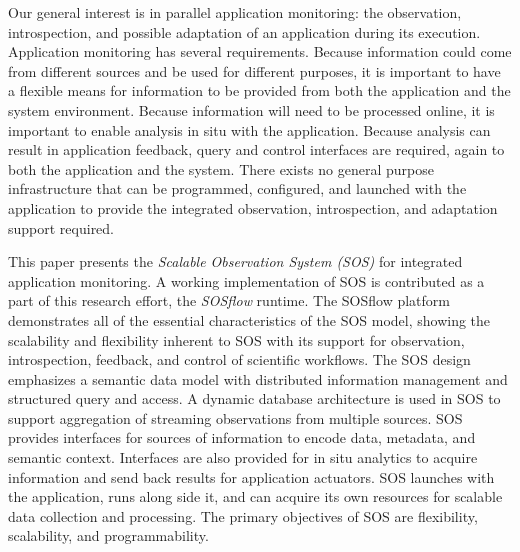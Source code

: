 
Our general interest is in parallel application monitoring: the
observation, introspection, and possible adaptation of an application
during its execution.
%
Application monitoring has several requirements.  Because information
could come from different sources and be used for different purposes,
it is important to have a flexible means for information to be
provided from both the application and the system environment.
%
Because information will need to be processed online, it is important
to enable analysis in situ with the application.
%
Because analysis can result in application feedback, query and control
interfaces are required, again to both the application and the system.
%
There exists no general purpose infrastructure that can be programmed,
configured, and launched with the application to provide the
integrated observation, introspection, and adaptation support
required.

This paper presents the \textit{Scalable Observation System (SOS)} for
integrated application monitoring.
%
A working implementation of SOS is contributed as a part of this
research effort, the \textit{SOSflow} runtime.
%
The SOSflow platform demonstrates all of the essential characteristics
of the SOS model, showing the scalability and flexibility inherent to
SOS with its support for observation, introspection, feedback, and
control of scientific workflows.
%
The SOS design emphasizes a semantic data model with distributed
information management and structured query and access.
%
A dynamic database architecture is used in SOS to support aggregation
of streaming observations from multiple sources.
%
SOS provides interfaces for sources of information to encode data,
metadata, and semantic context.
%
Interfaces are also provided for in situ analytics to acquire
information and send back results for application actuators.
%
SOS launches with the application, runs along side it, and can acquire
its own resources for scalable data collection and processing.
%
The primary objectives of SOS are flexibility, scalability, and
programmability.



